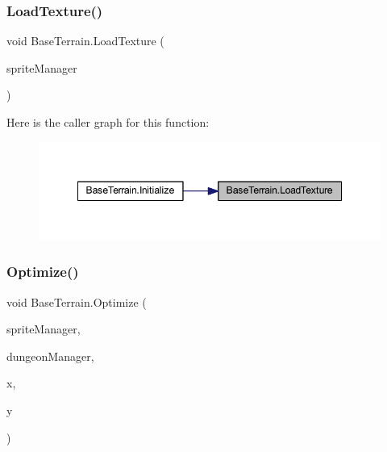 \subsubsection{\texorpdfstring{LoadTexture()}{LoadTexture()}}
{\footnotesize\ttfamily void Base\+Terrain.\+Load\+Texture (\begin{DoxyParamCaption}\item[{\mbox{\hyperlink{class_sprite_manager}{Sprite\+Manager}}}]{sprite\+Manager }\end{DoxyParamCaption})}

Here is the caller graph for this function\+:
\nopagebreak
\begin{figure}[H]
\begin{center}
\leavevmode
\includegraphics[width=348pt]{class_base_terrain_ada3cddbd511be2890cbb9635d997441b_icgraph}
\end{center}
\end{figure}
\mbox{\label{class_base_terrain_abda1c3ac02dc72095eb8c50ef68f8a2e}} 
\subsubsection{\texorpdfstring{Optimize()}{Optimize()}}
{\footnotesize\ttfamily void Base\+Terrain.\+Optimize (\begin{DoxyParamCaption}\item[{\mbox{\hyperlink{class_sprite_manager}{Sprite\+Manager}}}]{sprite\+Manager,  }\item[{\mbox{\hyperlink{class_dungeon_manager}{Dungeon\+Manager}}}]{dungeon\+Manager,  }\item[{int}]{x,  }\item[{int}]{y }\end{DoxyParamCaption})}

\mbox{\label{class_base_terrain_ac52fb05dde7ffc3a3d88af0122516052}} 

